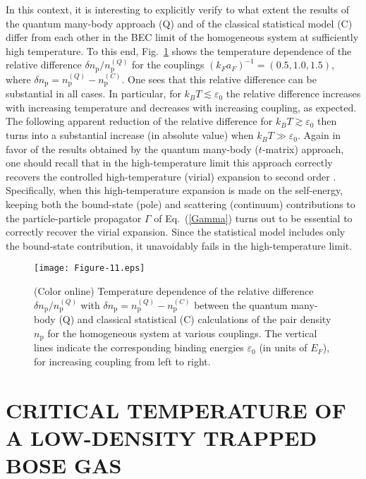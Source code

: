 \documentclass[pra,twocolumn,aps,amssymb,showpacs,superscriptaddress]{revtex4-1}
\begin{document}
In this context, it is interesting to explicitly verify to what extent the results of the quantum many-body approach (Q) and of the classical statistical model (C) differ from each other in the BEC limit of
the homogeneous system at sufficiently high temperature.
To this end, Fig.~\ref{Figure-11} shows the temperature dependence of the relative difference $\delta n_{\mathrm{p}}/n_{\mathrm{p}}^{(Q)}$ 
for the couplings $(k_{F} a_{F})^{-1} = (0.5,1.0,1.5)$, where $\delta n_{\mathrm{p}} = n_{\mathrm{p}}^{(Q)} - n_{\mathrm{p}}^{(C)}$. 
One sees that this relative difference can be substantial in all cases.
In particular, for $k_{B} T \lesssim \varepsilon_{0}$ the relative difference increases with increasing temperature and decreases with increasing coupling, as expected.
The following apparent reduction of the relative difference for $k_{B} T \gtrsim \varepsilon_{0}$ then turns into a substantial increase (in absolute value) when $k_{B} T \gg \varepsilon_{0}$. 
Again in favor of the results obtained by the quantum many-body ($t$-matrix) approach, one should recall that in the high-temperature limit this approach correctly recovers the controlled high-temperature (virial) expansion to second order \cite{Combescot-2006}. 
Specifically, when this high-temperature expansion is made on the self-energy, keeping both the bound-state (pole) and scattering (continuum) contributions to the particle-particle propagator $\Gamma$
of Eq.~(\ref{Gamma}) turns out to be essential to correctly recover the virial expansion.  
Since the statistical model includes only the bound-state contribution, it unavoidably fails in the high-temperature limit.

\begin{figure}[t]
\begin{center}
\texttt{[image: Figure-11.eps]}
\caption{(Color online) Temperature dependence of the relative difference $\delta n_{\mathrm{p}}/n_{\mathrm{p}}^{(Q)}$ with $\delta n_{\mathrm{p}} = n_{\mathrm{p}}^{(Q)} - n_{\mathrm{p}}^{(C)}$ 
                                     between the quantum many-body (Q) and classical statistical (C) calculations of the pair density $n_{\mathrm{p}}$ for the homogeneous system at various couplings. The vertical lines indicate the corresponding binding energies $\varepsilon_0$ (in units of $E_F$), for increasing coupling from left to right.}
\label{Figure-11}
\end{center}
\end{figure} 


\section{CRITICAL TEMPERATURE OF A LOW-DENSITY TRAPPED BOSE GAS}
\label{sec:appendix-scattering-length}
\end{document}
